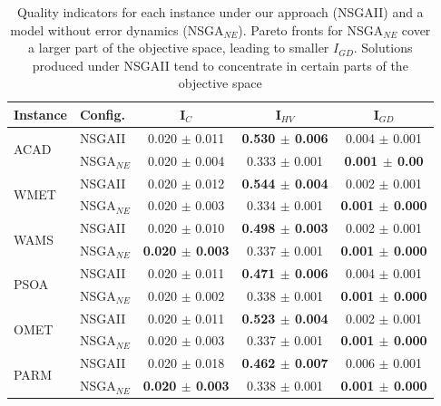 \documentclass[conference]{IEEEtran}
\begin{document}
\begin{table}[htbp]
	\scriptsize
  \centering
  \caption{Quality indicators for each instance under our approach (NSGAII) and a model without error dynamics (NSGA$_{NE}$). Pareto fronts for NSGA$_{NE}$ cover a larger part of the objective space, leading to smaller $I_{GD}$. Solutions produced under NSGAII tend to concentrate in certain parts of the objective space}
    \begin{tabular}{llccc}
    \toprule
    \textbf{Instance} & \textbf{Config.} & \textbf{I$_{C}$} & \textbf{I$_{HV}$} & \textbf{I$_{GD}$} \\
    \midrule
    \multirow{2}[2]{*}{ACAD} 
				  & NSGAII      &         0.020 $\pm$ 0.011  & \textbf{0.530 $\pm$ 0.006} &         0.004 $\pm$ 0.001  \\
          & NSGA$_{NE}$ &         0.020 $\pm$ 0.004  &         0.333 $\pm$ 0.001  & \textbf{0.001 $\pm$ 0.00}  \\\hline
    \multirow{2}[2]{*}{WMET} 
				  & NSGAII      &         0.020 $\pm$ 0.012  & \textbf{0.544 $\pm$ 0.004} &         0.002 $\pm$ 0.001  \\
          & NSGA$_{NE}$ &         0.020 $\pm$ 0.003  &         0.334 $\pm$ 0.001  & \textbf{0.001 $\pm$ 0.000} \\\hline
    \multirow{2}[2]{*}{WAMS} 
				  & NSGAII      &         0.020 $\pm$ 0.010  & \textbf{0.498 $\pm$ 0.003} &         0.002 $\pm$ 0.001  \\
          & NSGA$_{NE}$ & \textbf{0.020 $\pm$ 0.003} &         0.337 $\pm$ 0.001  & \textbf{0.001 $\pm$ 0.000} \\\hline
    \multirow{2}[2]{*}{PSOA} 
				  & NSGAII      &         0.020 $\pm$ 0.011  & \textbf{0.471 $\pm$ 0.006} &         0.004 $\pm$ 0.001  \\
          & NSGA$_{NE}$ &         0.020 $\pm$ 0.002  &         0.338 $\pm$ 0.001  & \textbf{0.001 $\pm$ 0.000} \\\hline
    \multirow{2}[2]{*}{OMET} 
				  & NSGAII      &         0.020 $\pm$ 0.011  & \textbf{0.523 $\pm$ 0.004} &         0.002 $\pm$ 0.001  \\
          & NSGA$_{NE}$ &         0.020 $\pm$ 0.003  &         0.337 $\pm$ 0.001  & \textbf{0.001 $\pm$ 0.000} \\\hline
    \multirow{2}[2]{*}{PARM} 
				  & NSGAII      &         0.020 $\pm$ 0.018  & \textbf{0.462 $\pm$ 0.007} &         0.006 $\pm$ 0.001  \\
          & NSGA$_{NE}$ & \textbf{0.020 $\pm$ 0.003} &         0.338 $\pm$ 0.001  & \textbf{0.001 $\pm$ 0.000} \\
    \bottomrule
    \end{tabular}%
\end{table}%
\end{document}
